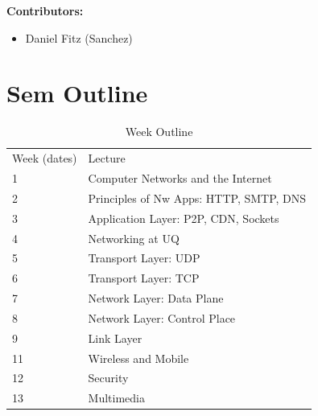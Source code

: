 \documentclass[12pt, a4paper]{article}
\begin{document}
	\tableofcontents
	\vspace{2em}
	\textbf{Contributors:}
	\begin{itemize}
		\item Daniel Fitz (Sanchez)
	\end{itemize}
	
	\section{Sem Outline}
	\begin{table}[H]
		\begin{tabular}{ll}
			Week (dates) & Lecture\\
			1 & Computer Networks and the Internet\\
			2 & Principles of Nw Apps: HTTP, SMTP, DNS\\
			3 & Application Layer: P2P, CDN, Sockets\\
			4 & Networking at UQ\\
			5 & Transport Layer: UDP\\
			6 & Transport Layer: TCP\\
			7 & Network Layer: Data Plane\\
			8 & Network Layer: Control Place\\
			9 & Link Layer\\
			11 & Wireless and Mobile\\
			12 & Security\\
			13 & Multimedia
		\end{tabular}
		\centering
		\caption{Week Outline}
	\end{table}
\end{document}
